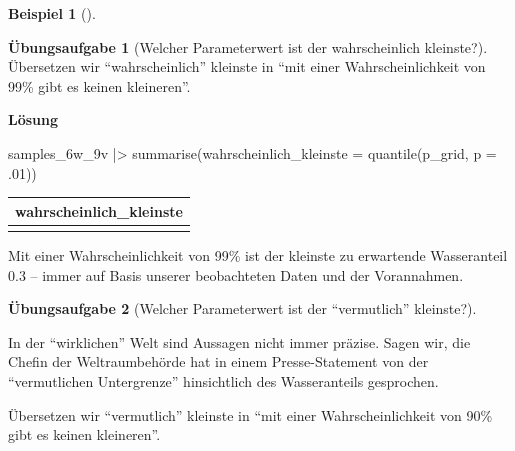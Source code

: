 \documentclass[
  ngerman,
  letterpaper,
  twoside,
  open=any]{scrbook}
\newenvironment{Shaded}{\begin{snugshade}}{\end{snugshade}}
\newcommand{\AttributeTok}[1]{\textcolor[rgb]{0.40,0.45,0.13}{#1}}
\newcommand{\DecValTok}[1]{\textcolor[rgb]{0.68,0.00,0.00}{#1}}
\newcommand{\FunctionTok}[1]{\textcolor[rgb]{0.28,0.35,0.67}{#1}}
\newcommand{\NormalTok}[1]{\textcolor[rgb]{0.00,0.23,0.31}{#1}}
\newcommand{\SpecialCharTok}[1]{\textcolor[rgb]{0.37,0.37,0.37}{#1}}
\newcounter{none} %
\theoremstyle{definition}
\newtheorem{example}{Beispiel}[chapter]
\theoremstyle{plain}
\theoremstyle{definition}
\newtheorem{exercise}{Übungsaufgabe}[chapter]
\theoremstyle{definition}
\theoremstyle{remark}
\begin{document}
\begin{example}[]
\begin{exercise}[Welcher Parameterwert ist der wahrscheinlich
kleinste?]
Übersetzen wir \enquote{wahrscheinlich} kleinste in \enquote{mit einer
Wahrscheinlichkeit von 99\% gibt es keinen kleineren}.

\begin{tcolorbox}[enhanced jigsaw, arc=.35mm, bottomrule=.15mm, breakable, colback=white, colframe=quarto-callout-tip-color-frame, left=2mm, leftrule=.75mm, opacityback=0, rightrule=.15mm, toprule=.15mm]

\vspace{-3mm}\textbf{Lösung}\vspace{3mm}

\begin{Shaded}
\begin{Highlighting}[]
\NormalTok{samples\_6w\_9v }\SpecialCharTok{|\textgreater{}} 
  \FunctionTok{summarise}\NormalTok{(}\AttributeTok{wahrscheinlich\_kleinste =} 
              \FunctionTok{quantile}\NormalTok{(p\_grid, }\AttributeTok{p =}\NormalTok{ .}\DecValTok{01}\NormalTok{))}
\end{Highlighting}
\end{Shaded}

{\def\LTcaptype{none} %
\begin{longtable}[]{@{}r@{}}
\toprule\noalign{}
wahrscheinlich\_kleinste \\
\midrule\noalign{}
\endhead
\bottomrule\noalign{}
\endlastfoot
0.3 \\
\end{longtable}
}

Mit einer Wahrscheinlichkeit von 99\% ist der kleinste zu erwartende
Wasseranteil 0.3 -- immer auf Basis unserer beobachteten Daten und der
Vorannahmen.

\end{tcolorbox}

\end{exercise}

\begin{exercise}[Welcher Parameterwert ist der \enquote{vermutlich}
kleinste?]\protect\hypertarget{exr-quant3}{}\label{exr-quant3}

In der \enquote{wirklichen} Welt sind Aussagen nicht immer präzise.
Sagen wir, die Chefin der Weltraumbehörde hat in einem Presse-Statement
von der \enquote{vermutlichen Untergrenze} hinsichtlich des
Wasseranteils gesprochen.

Übersetzen wir \enquote{vermutlich} kleinste in \enquote{mit einer
Wahrscheinlichkeit von 90\% gibt es keinen kleineren}.

\begin{tcolorbox}[enhanced jigsaw, arc=.35mm, bottomrule=.15mm, breakable, colback=white, colframe=quarto-callout-tip-color-frame, left=2mm, leftrule=.75mm, opacityback=0, rightrule=.15mm, toprule=.15mm]


\end{tcolorbox}
\end{exercise}
\end{example}
\end{document}
